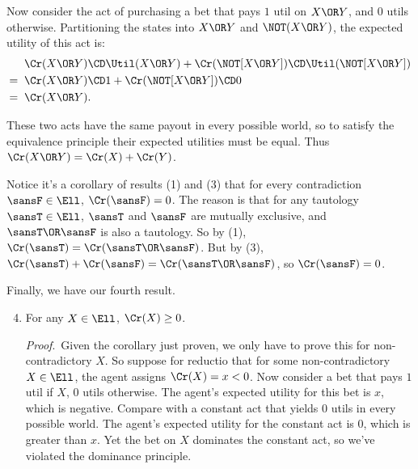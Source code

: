 \begin{enumerate}
Now consider the act of purchasing a bet that pays $1$ util on $X \OR Y$, and $0$ utils otherwise. Partitioning the states into $X \OR Y$ and $\NOT (X \OR Y)$, the expected utility of this act is:
\begin{equation}
\begin{aligned}
  &\;\; \Cr(X \OR Y) \CD \Util(X \OR Y) + \Cr(\NOT [X \OR Y]) \CD \Util(\NOT [X \OR Y])\\
= &\;\; \Cr(X \OR Y) \CD 1 + \Cr(\NOT [X \OR Y]) \CD 0\\
= &\;\; \Cr(X \OR Y).
\end{aligned}
\end{equation}

These two acts have the same payout in every possible world, so to satisfy the equivalence principle their expected utilities must be equal. Thus $\Cr(X \OR Y)=\Cr(X) + \Cr(Y)$.
\end{enumerate}

Notice it's a corollary of results (1) and (3) that for every contradiction $\sansF \in \Ell$, $\Cr(\sansF)=0$. The reason is that for any tautology $\sansT \in \Ell$, $\sansT$ and $\sansF$ are mutually exclusive, and $\sansT \OR \sansF$ is also a tautology. So by (1), $\Cr(\sansT)=\Cr(\sansT \OR \sansF)$. But by (3), $\Cr(\sansT) + \Cr(\sansF)=\Cr(\sansT \OR \sansF)$, so $\Cr(\sansF)=0$.

Finally, we have our fourth result.
\begin{enumerate} \setcounter{enumi}{3}
\item For any $X \in \Ell$, $\Cr(X) \ge 0$.

\emph{Proof}.\, Given the corollary just proven, we only have to prove this for non-contradictory $X$. So suppose for reductio that for some non-contradictory $X \in \Ell$, the agent assigns $\Cr(X)=x<0$. Now consider a bet that pays $1$ util if $X$, $0$ utils otherwise. The agent's expected utility for this bet is $x$, which is negative. Compare with a constant act that yields $0$ utils in every possible world. The agent's expected utility for the constant act is $0$, which is greater than $x$. Yet the bet on $X$ dominates the constant act, so we've violated the dominance principle.
\end{enumerate}